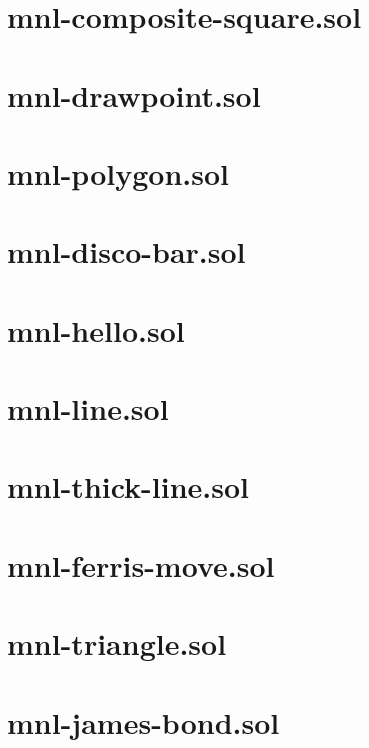 \section{mnl-composite-square.sol}


\section{mnl-drawpoint.sol}


\section{mnl-polygon.sol}


\section{mnl-disco-bar.sol}


\section{mnl-hello.sol}


\section{mnl-line.sol}


\section{mnl-thick-line.sol}


\section{mnl-ferris-move.sol}


\section{mnl-triangle.sol}


\section{mnl-james-bond.sol}


